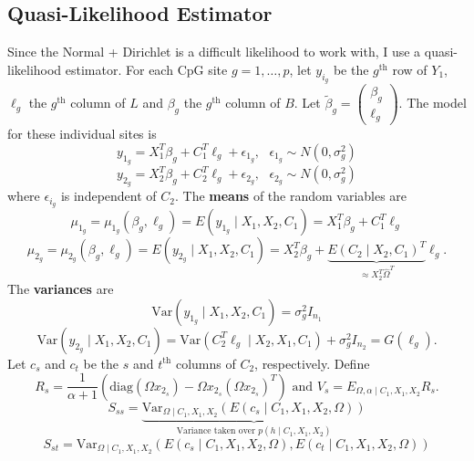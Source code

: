 \documentclass{article}
\begin{document}
\subsection{Quasi-Likelihood Estimator}
Since the Normal + Dirichlet is a difficult likelihood to work with, I use a quasi-likelihood estimator. For each CpG site $g = 1, \ldots, p$, let $y_{i_g}$ be the $g^{\text{th}}$ row of $Y_1$, $\ell_g$ the $g^{\text{th}}$ column of $L$ and $\beta_g$ the $g^{\text{th}}$ column of $B$. Let $\tilde{\beta}_g = \left( \begin{matrix}
\beta_g\\
\ell_g
\end{matrix} \right)$. The model for these individual sites is
\[
y_{1_g} = X_1^T \beta_g + C_1^T \ell_g + \epsilon_{1_g}, \text{ } \epsilon_{1_g} \sim N\left( 0, \sigma_g^2 \right)
\]
\[
y_{2_g} = X_2^T \beta_g + C_2^T \ell_g + \epsilon_{2_g}, \text{ } \epsilon_{2_g} \sim N\left( 0, \sigma_g^2 \right)
\]
where $\epsilon_{i_g}$ is independent of $C_2$. The \textbf{means} of the random variables are
\[
\mu_{1_g} = \mu_{1_g}\left( \beta_g, \ell_g \right) = E\left( y_{1_g} \mid X_1, X_2, C_1 \right) = X_1^T \beta_g + C_1^T \ell_g
\]
\[
\mu_{2_g} = \mu_{2_g}\left( \beta_g, \ell_g \right) = E\left( y_{2_g} \mid X_1, X_2, C_1 \right) = X_2^T \beta_g + \underbrace{E\left( C_2 \mid X_2, C_1 \right)^T}_{\approx X_2^T \hat{\Omega}^T} \ell_g.
\]
The \textbf{variances} are
\[
\text{Var}\left( y_{1_g} \mid X_1, X_2, C_1 \right) = \sigma_g^2 I_{n_1}
\]
\[
\text{Var}\left( y_{2_g} \mid X_1, X_2, C_1 \right) = \text{Var}\left( C_2^T \ell_g \mid X_2, X_1, C_1 \right) + \sigma_g^2 I_{n_2} = G\left( \ell_g \right).
\]
Let $c_s$ and $c_t$ be the $s$ and $t^{\text{th}}$ columns of $C_2$, respectively. Define
\[
R_s = \frac{1}{\alpha + 1}\left( \text{diag}\left( \Omega x_{2_s} \right) - \Omega x_{2_s} \left( \Omega x_{2_s} \right)^T \right) \text{ and } V_s = E_{\Omega, \alpha \mid C_1, X_1, X_2}R_s.
\]
\[
S_{ss} = \underbrace{\text{Var}_{\Omega\mid C_1, X_1, X_2}\left( E\left( c_s \mid C_1, X_1, X_2, \Omega \right) \right)}_{\text{Variance taken over $p\left( h \mid C_1, X_1, X_2 \right)$}}
\]
\[
S_{st} = \text{Var}_{\Omega\mid C_1, X_1, X_2} \left( E\left( c_s \mid C_1, X_1, X_2, \Omega \right), E\left( c_t \mid C_1, X_1, X_2, \Omega \right) \right)
\]
\end{document}
